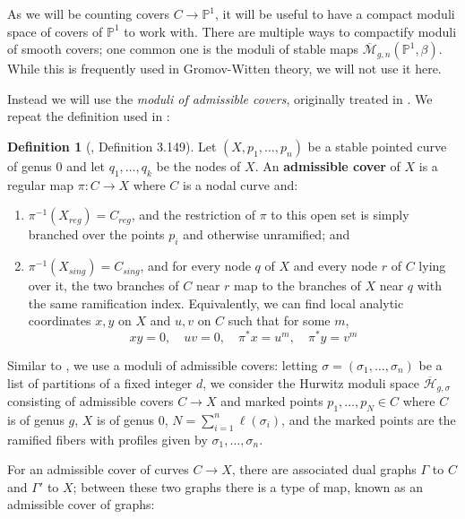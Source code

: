 \documentclass[thesis]{thesis-umich}           %
\newcommand{\Hb}{\overline{\mathcal H}}
\renewcommand{\P}{\mathbb P}
\theoremstyle{definition}
\newtheorem{dfn}[thm]{Definition}
\begin{document}
As we will be counting covers $C\to\P^1$, it will be useful
to have a compact moduli space of covers of $\P^1$ to work with.
There are multiple ways to compactify moduli of smooth covers;
one common one is the moduli of stable maps $\overline{\mathcal M}_{g,n}(\P^1,\beta)$. While this is frequently used in Gromov-Witten theory,
we will not use it here.

Instead we will use the {\it moduli of admissible covers}, originally
treated in \cite{Admissible}. We repeat the definition used in \cite{Moduli}:

\begin{dfn}[\cite{Moduli}, Definition 3.149]
  Let $(X,p_1,\dots,p_n)$ be a stable pointed curve of genus $0$
  and let $q_1,\dots,q_k$ be the nodes of $X$.
  An {\bf admissible cover} of $X$ is a regular map $\pi:C\to X$ where $C$ is
  a nodal curve and:
  \begin{enumerate}
  \item $\pi^{-1}(X_{reg})=C_{reg}$, and the restriction of $\pi$ to
    this open set is simply branched over the points $p_i$ and otherwise
    unramified; and
  \item $\pi^{-1}(X_{sing})=C_{sing}$, and for every node $q$ of $X$ and
    every node $r$ of $C$ lying over it, the two branches of $C$ near
    $r$ map to the branches of $X$ near $q$ with the same ramification index.
    Equivalently, we can find local analytic coordinates $x,y$ on $X$ and $u,v$ on $C$ such that for some $m$,
    \[
    xy=0,\quad uv=0,\quad \pi^*x=u^m,\quad \pi^*y=v^m
    \]
    \end{enumerate}

  \end{dfn}

Similar to \cite{Generalized}, we use
a moduli of admissible covers: letting
$\sigma=(\sigma_1,\dots,\sigma_n)$ be a list of
partitions of a fixed integer $d$, we consider the
Hurwitz moduli space $\Hb_{g,\sigma}$ consisting of admissible covers
$C\to X$ and marked points $p_1,\dots,p_N\in C$ where $C$ is
of genus $g$, $X$ is of genus $0$,
$N=\sum_{i=1}^n\ell(\sigma_i)$, and the marked points
are the ramified fibers with profiles given by $\sigma_1,\dots,\sigma_n$.

For an admissible cover of curves $C\to X$, there are associated dual
graphs $\Gamma$ to $C$ and $\Gamma'$ to $X$; between these two graphs
there is a type of map, known as an admissible cover of graphs:
\end{document}
